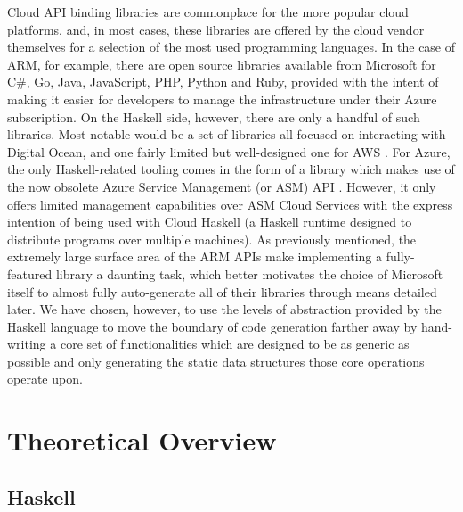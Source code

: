 \documentclass[11pt]{report}
\begin{document}
Cloud API binding libraries are commonplace for the more popular cloud
platforms, and, in most cases, these libraries are offered by the cloud vendor
themselves for a selection of the most used programming languages.
In the case of ARM, for example, there are open source libraries
\cite{listOfAzureSDKs} available from Microsoft for C\#, Go, Java, JavaScript,
PHP, Python and Ruby, provided with the intent of making it easier for
developers to manage the infrastructure under their Azure subscription. \newline
On the Haskell side, however, there are only a handful of such libraries. Most
notable would be a set of libraries all focused on interacting with Digital
Ocean, and one fairly limited but well-designed one for AWS\@
\cite{niceAwsSdk}. For Azure, the only Haskell-related tooling comes in the
form of a library which makes use of the now obsolete Azure Service Management
(or ASM) API \cite{distributedProcessAzure}. However, it only offers limited
management capabilities over ASM Cloud Services with the express intention
of being used with Cloud Haskell (a Haskell runtime designed to distribute
programs over multiple machines). \newline
As previously mentioned, the extremely large surface area of the ARM APIs make
implementing a fully-featured library a daunting task, which better motivates the
choice of Microsoft itself to almost fully auto-generate all of their libraries
through means detailed later. We have chosen, however, to use the levels of
abstraction provided by the Haskell language to move the boundary of code
generation farther away by hand-writing a core set of functionalities which are
designed to be as generic as possible and only generating the static data structures
those core operations operate upon.

\newpage

\chapter{Theoretical Overview}

\section{Haskell}
\end{document}
